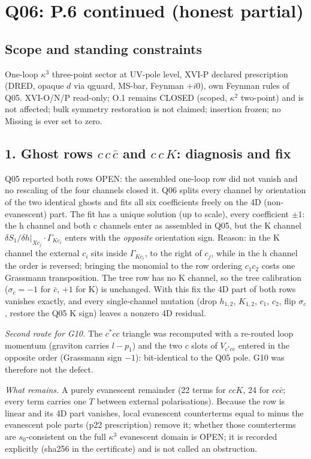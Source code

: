 \section{Q06: P.6 continued (honest partial)}
\subsection*{Scope and standing constraints}
One-loop $\kappa^3$ three-point sector at UV-pole level, XVI-P declared prescription (DRED, opaque $d$ via qguard,
MS-bar, Feynman $+i0$), own Feynman rules of Q05.  XVI-O/N/P read-only; O.1 remains CLOSED (scoped, $\kappa^2$
two-point) and is not affected; bulk symmetry restoration is not claimed; insertion frozen; no Missing is ever set to zero.

\subsection*{1. Ghost rows $c\,c\,\bar c$ and $c\,c\,K$: diagnosis and fix}
Q05 reported both rows OPEN: the assembled one-loop row did not vanish and no rescaling of the four channels closed it.
Q06 splits every channel by orientation of the two identical ghosts and fits all six coefficients freely on the 4D
(non-evanescent) part.  The fit has a unique solution (up to scale), every coefficient $\pm1$:
the h channel and both c channels enter as assembled in Q05, but the K channel
$\delta S_1/\delta h|_{X c_j}\cdot\Gamma_{K c_i}$ enters with the \emph{opposite} orientation sign.  Reason: in the K
channel the external $c_i$ sits inside $\Gamma_{Kc_i}$, to the right of $c_j$, while in the h channel the order is
reversed; bringing the monomial to the row ordering $c_1c_2$ costs one Grassmann transposition.  The tree row has no K
channel, so the tree calibration ($\sigma_c=-1$ for $\bar c$, $+1$ for K) is unchanged.  With this fix the 4D part of
both rows vanishes exactly, and every single-channel mutation (drop $h_{1,2}$, $K_{1,2}$, $c_1$, $c_2$, flip $\sigma_c$,
restore the Q05 K sign) leaves a nonzero 4D residual.

\emph{Second route for G10.}  The $c^*cc$ triangle was recomputed with a re-routed loop momentum (graviton carries
$l-p_1$) and the two $c$ slots of $V_{c^*cc}$ entered in the opposite order (Grassmann sign $-1$): bit-identical to the
Q05 pole.  G10 was therefore not the defect.

\emph{What remains.}  A purely evanescent remainder (22 terms for $ccK$, 24 for $cc\bar c$; every term carries one
$T$ between external polarisations).  Because the row is linear and its 4D part vanishes, local evanescent counterterms equal to minus the evanescent
pole parts (p22 prescription) remove it; whether those counterterms are $s_0$-consistent on the full $\kappa^3$
evanescent domain is OPEN; it is recorded explicitly (sha256 in the certificate) and is
not called an obstruction.

